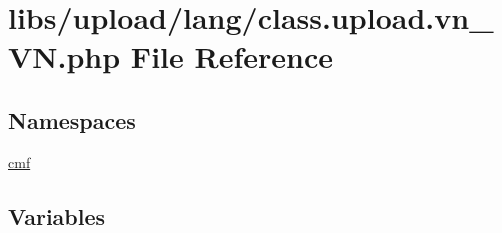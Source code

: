 \hypertarget{class_8upload_8vn___v_n_8php}{}\section{libs/upload/lang/class.upload.\+vn\+\_\+\+V\+N.\+php File Reference}
\label{class_8upload_8vn___v_n_8php}
\subsection*{Namespaces}
\begin{DoxyCompactItemize}
\item 
 \hyperlink{namespacecmf}{cmf}
\end{DoxyCompactItemize}
\subsection*{Variables}
